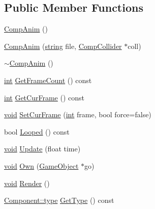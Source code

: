 \subsection*{Public Member Functions}
\begin{DoxyCompactItemize}
\item 
\hyperlink{class_comp_anim_a91bd2d2bea5082f5f74635f12d4f276a}{Comp\-Anim} ()
\item 
\hyperlink{class_comp_anim_a846147b0dcfbb51ad8ab936797e2cf6a}{Comp\-Anim} (\hyperlink{_s_d_l__opengl__glext_8h_ae84541b4f3d8e1ea24ec0f466a8c568b}{string} file, \hyperlink{class_comp_collider}{Comp\-Collider} $\ast$coll)
\item 
\hyperlink{class_comp_anim_ac1b228a3161bf42d98193aebf70b7779}{$\sim$\-Comp\-Anim} ()
\item 
\hyperlink{_s_d_l__thread_8h_a6a64f9be4433e4de6e2f2f548cf3c08e}{int} \hyperlink{class_comp_anim_a3e6cc4751dbfca6e943fc4fceb6f507b}{Get\-Frame\-Count} () const 
\item 
\hyperlink{_s_d_l__thread_8h_a6a64f9be4433e4de6e2f2f548cf3c08e}{int} \hyperlink{class_comp_anim_a27cac4515350597b66a6e46242e39eea}{Get\-Cur\-Frame} () const 
\item 
\hyperlink{_s_d_l__opengles2__gl2ext_8h_ae5d8fa23ad07c48bb609509eae494c95}{void} \hyperlink{class_comp_anim_ab3167e189c39d976a4474874b0b2b168}{Set\-Cur\-Frame} (\hyperlink{_s_d_l__thread_8h_a6a64f9be4433e4de6e2f2f548cf3c08e}{int} frame, bool force=false)
\item 
bool \hyperlink{class_comp_anim_ac6bd76a5091dac4a91966773330c31d1}{Looped} () const 
\item 
\hyperlink{_s_d_l__opengles2__gl2ext_8h_ae5d8fa23ad07c48bb609509eae494c95}{void} \hyperlink{class_comp_anim_ac2e2e27fe70b13a8cce4f8a1df792e59}{Update} (float time)
\item 
\hyperlink{_s_d_l__opengles2__gl2ext_8h_ae5d8fa23ad07c48bb609509eae494c95}{void} \hyperlink{class_comp_anim_a41d7df3049e9cf1db1d8f00cbaf73062}{Own} (\hyperlink{class_game_object}{Game\-Object} $\ast$go)
\item 
\hyperlink{_s_d_l__opengles2__gl2ext_8h_ae5d8fa23ad07c48bb609509eae494c95}{void} \hyperlink{class_comp_anim_a5a453e9ac658863696c3db745e6fc0bf}{Render} ()
\item 
\hyperlink{class_component_ad6d161b6acf7b843b55bb9feac7af71a}{Component\-::type} \hyperlink{class_comp_anim_af25364111916fa6b5841d039d696295f}{Get\-Type} () const 
\end{DoxyCompactItemize}
